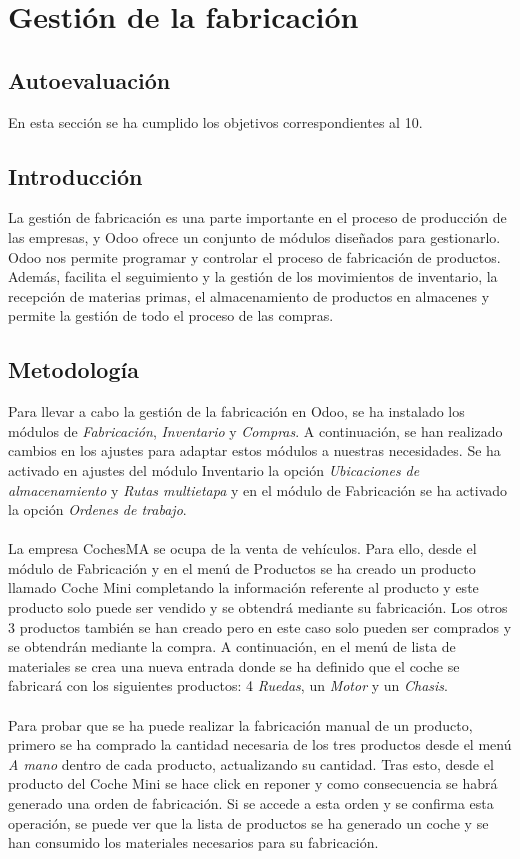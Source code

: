 
\section{Gestión de la fabricación}
\subsection{Autoevaluación}
En esta sección se ha cumplido los objetivos correspondientes al 10.
\subsection{Introducción}
La gestión de fabricación es una parte importante en el proceso de producción de las empresas, y Odoo ofrece un conjunto de módulos diseñados para gestionarlo. Odoo nos permite programar y controlar el proceso de fabricación de productos. Además, facilita el seguimiento y la gestión de los movimientos de inventario, la recepción de materias primas, el almacenamiento de productos en almacenes y permite la gestión de todo el proceso de las compras.
\subsection{Metodología}
Para llevar a cabo la gestión de la fabricación en Odoo, se ha instalado los módulos de \textit{Fabricación}, \textit{Inventario} y \textit{Compras}. A continuación, se han realizado cambios en los ajustes para adaptar estos módulos a nuestras necesidades. Se ha activado en ajustes del módulo Inventario la opción \textit{Ubicaciones de almacenamiento} y \textit{Rutas multietapa} y en el módulo de Fabricación se ha activado la opción \textit{Ordenes de trabajo}. 
\paragraph{}
La empresa CochesMA se ocupa de la venta de vehículos. Para ello, desde el módulo de Fabricación y en el menú de Productos se ha creado un producto llamado Coche Mini completando la información referente al producto y este producto solo puede ser vendido y se obtendrá mediante su fabricación. Los otros 3 productos también se han creado pero en este caso solo pueden ser comprados y se obtendrán mediante la compra. A continuación, en el menú de lista de materiales se crea una nueva entrada donde se ha definido que el coche se fabricará con los siguientes productos: 4 \textit{Ruedas}, un \textit{Motor} y un \textit{Chasis}. 
\paragraph{}
Para probar que se ha puede realizar la fabricación manual de un producto, primero se ha comprado la cantidad necesaria de los tres productos desde el menú \textit{A mano} dentro de cada producto, actualizando su cantidad. Tras esto, desde el producto del Coche Mini se hace click en reponer y como consecuencia se habrá generado una orden de fabricación. Si se accede a esta orden y se confirma esta operación, se puede ver que la lista de productos se ha generado un coche y se han consumido los materiales necesarios para su fabricación. 
